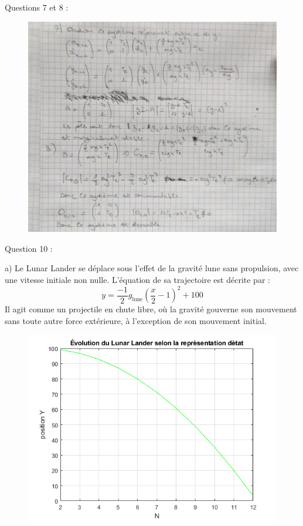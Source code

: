 \documentclass[14pt]{extarticle}
\begin{document}
\break
Questions 7 et 8 :
\newline 

\begin{figure} [tbh]
\vspace{0.1cm}
\centering
\includegraphics[width=\columnwidth]{"images/q7_q8.jpg"}
        
\end{figure}

\break 

Question 10 : 

a) Le Lunar Lander se déplace sous l'effet de la gravité lune sans propulsion, avec une vitesse initiale non nulle. L'équation de sa trajectoire est décrite par :
\[y = \frac{-1}{2}g_{\text{lune}}(\frac{x}{2} -1)^2 + 100\]
Il agit comme un projectile en chute libre, où la gravité gouverne son mouvement sans toute autre force extérieure, à l'exception de son mouvement initial.
\begin{figure} [tbh]
    \vspace{0.1cm}
        \centering
        \includegraphics[width=\columnwidth]{"images/q10_1.png"}
    
    \end{figure}
\end{document}

